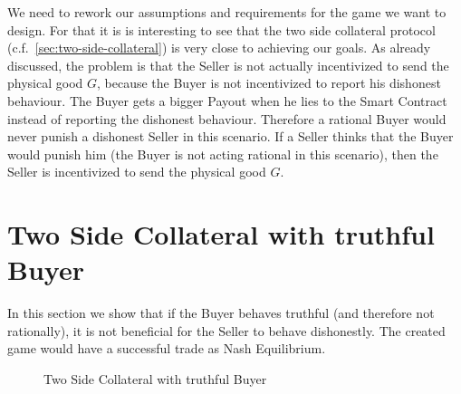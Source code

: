 \documentclass{cacthesis}
\begin{document}
We need to rework our assumptions and requirements for the game we want to design. For that it is is interesting to see that the two side collateral protocol (c.f.~\ref{sec:two-side-collateral}) is very close to achieving our goals. As already discussed, the problem is that the Seller is not actually incentivized to send the physical good $G$, because the Buyer is not incentivized to report his dishonest behaviour. The Buyer gets a bigger Payout when he lies to the Smart Contract instead of reporting the dishonest behaviour. Therefore a rational Buyer would never punish a dishonest Seller in this scenario. If a Seller thinks that the Buyer would punish him (the Buyer is not acting rational in this scenario), then the Seller is incentivized to send the physical good $G$.\newline
\section{Two Side Collateral with truthful Buyer} 
In this section we show that if the Buyer behaves truthful (and therefore not rationally), it is not beneficial for the Seller to behave dishonestly. The created game would have a successful trade as Nash Equilibrium.\newline
\begin{figure}[htb!]
    \centering
    \label{fig:payout-truthful-buyer}
    \caption{Two Side Collateral with truthful Buyer}
\end{figure}
\end{document}

